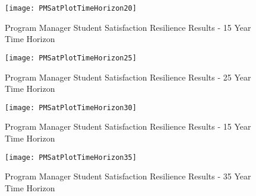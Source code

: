 \documentclass[preprint,12pt]{elsarticle}
\begin{document}
\begin{figure}[h]
  \centering\texttt{[image: PMSatPlotTimeHorizon20]}
  \caption{Program Manager Student Satisfaction Resilience Results - 15 Year Time Horizon}
  \label{f:PMresultsSat20}
\end{figure}

\begin{figure}[h]
  \centering\texttt{[image: PMSatPlotTimeHorizon25]}
  \caption{Program Manager Student Satisfaction Resilience Results - 25 Year Time Horizon}
  \label{f:PMresultsSat25}
\end{figure}

\begin{figure}[h]
  \centering\texttt{[image: PMSatPlotTimeHorizon30]}
  \caption{Program Manager Student Satisfaction Resilience Results - 15 Year Time Horizon}
  \label{f:PMresultsSat30}
\end{figure}

\begin{figure}[h]
  \centering\texttt{[image: PMSatPlotTimeHorizon35]}
  \caption{Program Manager Student Satisfaction Resilience Results - 35 Year Time Horizon}
  \label{f:PMresultsSat35}
\end{figure}


\begin{table}[h]
  \centering
  \caption{Program Manager Preferred Course of Action}
  \label{t:PreferredCOA_PM_No_Chi}
\end{table}
\end{document}
